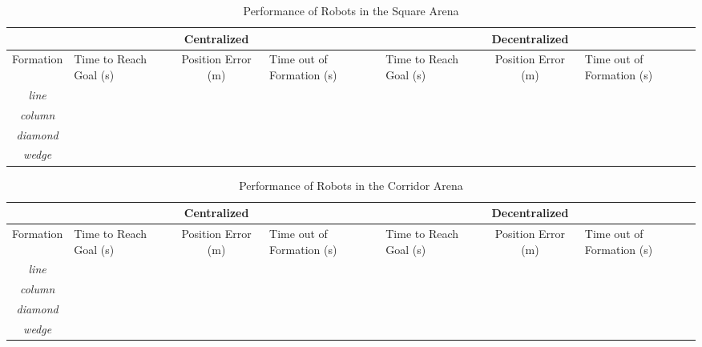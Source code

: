 \documentclass[letterpaper, 10 pt, conference]{ieeeconf}  %
\begin{document}
\begin{table}[t]
\begin{tabular}{@{}cp{1.75cm}cp{1.5cm}p{1.75cm}cp{1.5cm}@{}}
\toprule
 & & Centralized & & & Decentralized & \\
\midrule
Formation & Time to Reach Goal (s) & Position Error (m) & Time out of Formation (s) & Time to Reach Goal (s) & Position Error (m) & Time out of Formation (s) \\
\textit{line}        &                        &                    &                           &                        &                    &                           \\
\textit{column}      &                        &                    &                           &                        &                    &                           \\
\textit{diamond}     &                        &                    &                           &                        &                    &                           \\
\textit{wedge}       &                        &                    &                           &                        &                    &                           \\ \bottomrule
\end{tabular}
\caption{Performance of Robots in the Square Arena}
\label{tab:results_square}
\end{table}

\begin{table}[t]
\begin{tabular}{@{}cp{1.75cm}cp{1.5cm}p{1.75cm}cp{1.5cm}@{}}
\toprule
 & & Centralized & & & Decentralized & \\
\midrule
Formation & Time to Reach Goal (s) & Position Error (m) & Time out of Formation (s) & Time to Reach Goal (s) & Position Error (m) & Time out of Formation (s) \\
\textit{line}        &                        &                    &                           &                        &                    &                           \\
\textit{column}      &                        &                    &                           &                        &                    &                           \\
\textit{diamond}     &                        &                    &                           &                        &                    &                           \\
\textit{wedge}       &                        &                    &                           &                        &                    &                           \\ \bottomrule
\end{tabular}
\caption{Performance of Robots in the Corridor Arena}
\label{tab:results_corridor}
\end{table}
\end{document}
